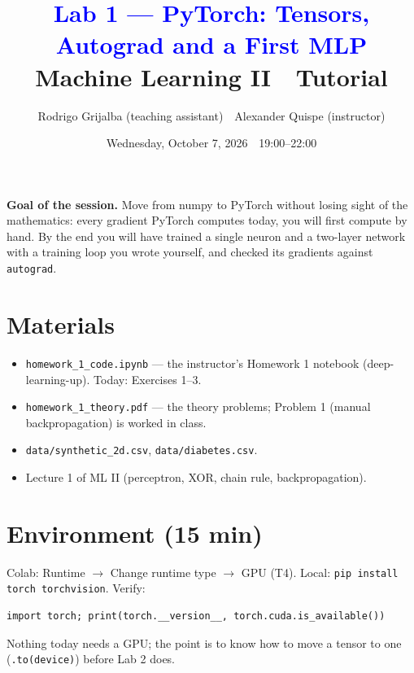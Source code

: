 \documentclass[11pt]{article}
\title{\textcolor{blue}{Lab 1 --- PyTorch: Tensors, Autograd and a First MLP}\\[4pt]
\large Machine Learning II \,\textperiodcentered\, Tutorial}
\author{Rodrigo Grijalba (teaching assistant) \,\textperiodcentered\, Alexander Quispe (instructor)}
\date{Wednesday, October 7, 2026 \,\textperiodcentered\, 19:00--22:00}
\begin{document}
\maketitle

\begin{keypoint}
\textbf{Goal of the session.} Move from numpy to PyTorch without losing sight of the mathematics:
every gradient PyTorch computes today, you will first compute by hand. By the end you will have
trained a single neuron and a two-layer network with a training loop you wrote yourself, and checked
its gradients against \texttt{autograd}.
\end{keypoint}

\section*{Materials}
\begin{itemize}[nosep]
  \item \texttt{homework\_1\_code.ipynb} --- the instructor's Homework 1 notebook (deep-learning-up). Today: Exercises 1--3.
  \item \texttt{homework\_1\_theory.pdf} --- the theory problems; Problem 1 (manual backpropagation) is worked in class.
  \item \texttt{data/synthetic\_2d.csv}, \texttt{data/diabetes.csv}.
  \item Lecture 1 of ML II (perceptron, XOR, chain rule, backpropagation).
\end{itemize}

\section{Environment (15 min)}
Colab: Runtime $\to$ Change runtime type $\to$ GPU (T4). Local: \texttt{pip install torch torchvision}.
Verify:
\begin{lstlisting}
import torch; print(torch.__version__, torch.cuda.is_available())
\end{lstlisting}
Nothing today needs a GPU; the point is to know how to move a tensor to one (\texttt{.to(device)}) before Lab 2 does.
\end{document}
